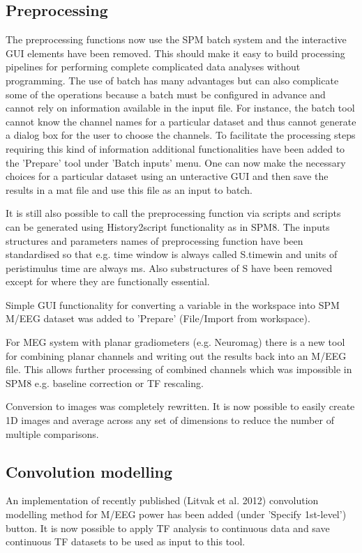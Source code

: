 \documentclass[a4paper,titlepage,openany]{article}
\begin{document}
\begin{multicols}{2}
\subsection{Preprocessing}

The preprocessing functions now use the SPM batch system and the interactive GUI elements have been removed. This should make it easy to build processing pipelines for performing complete complicated data analyses without programming. The use of batch has many advantages but can also complicate some of the operations because a batch must be configured in advance and cannot rely on information available in the input file. For instance, the batch tool cannot know the channel names for a particular dataset and thus cannot generate a dialog box for the user to choose the channels. To facilitate the processing steps requiring this kind of information additional functionalities have been added to the 'Prepare' tool under 'Batch inputs' menu. One can now make the necessary choices for a particular dataset using an unteractive GUI and then save the results in a mat file and use this file as an input to batch. 

It is still also possible to call the preprocessing function via scripts and scripts can be generated using History2script functionality as in SPM8. The inputs structures and parameters names of preprocessing function have been standardised so that e.g. time window is always called S.timewin and units of peristimulus time are always ms. Also substructures of S have been removed except for where they are functionally essential. 

Simple GUI functionality for converting a variable in the workspace into SPM M/EEG dataset was added to 'Prepare' (File/Import from workspace). 

For MEG system with planar gradiometers (e.g. Neuromag) there is a new tool for combining planar channels and writing out the results back into an M/EEG file. This allows further processing of combined channels which was impossible in SPM8 e.g. baseline correction or TF rescaling. 

Conversion to images was completely rewritten. It is now possible to easily create 1D images and average across any set of dimensions to reduce the number of multiple comparisons.

\subsection{Convolution modelling}
An implementation of recently published (Litvak et al. 2012) convolution modelling method for M/EEG power has been added (under 'Specify 1st-level') button. It is now possible to apply TF analysis to continuous data and save continuous TF datasets to be used as input to this tool. 



\end{multicols}
\end{document}
